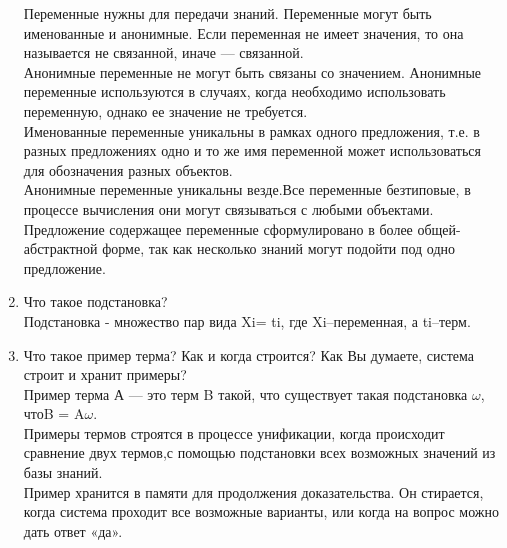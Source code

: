\documentclass[12pt, a4paper]{extarticle}
\begin{document}
\begin{enumerate}
	Переменные нужны для передачи знаний. Переменные могут быть именованные и анонимные. Если переменная не имеет значения, то она называется не связанной, иначе — связанной. \\
	Анонимные переменные не могут быть связаны со значением. Анонимные переменные используются в случаях, когда необходимо использовать переменную, однако ее значение не требуется.  \\
	Именованные переменные уникальны в рамках одного предложения, т.е. в разных предложениях одно и то же имя переменной может использоваться для обозначения разных объектов.\\
	Анонимные переменные уникальны везде.Все переменные безтиповые, в процессе вычисления они могут связываться с любыми объектами. \\
	Предложение содержащее переменные сформулировано в более общей-абстрактной форме, так как несколько знаний могут подойти под одно предложение. 
	\item Что такое подстановка?\\
	Подстановка - множество пар вида {Xi= ti}, где Xi–переменная, а ti–терм.
	\item Что такое пример терма? Как и когда строится? Как Вы думаете, система строит и хранит примеры?\\
	Пример терма  А — это терм B такой, что существует такая подстановка $\omega$, чтоB = A$\omega$.\\
	Примеры термов строятся в процессе унификации, когда  происходит сравнение двух термов,с помощью подстановки всех возможных значений из базы знаний. \\
	Пример хранится в памяти для продолжения доказательства. Он стирается, когда система проходит все возможные варианты, или когда на вопрос можно дать ответ «да».
\end{enumerate}
\end{document}
